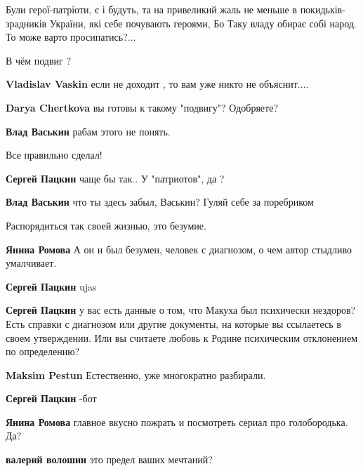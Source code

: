 \begin{itemize}

Були герої-патріоти, є і будуть, та на привеликий жаль не меньше в
покидьків-зрадників України, які себе почувають героями, Бо Таку владу обирає
собі народ. То може варто просипатись?...

В чём подвиг ?

\begin{itemize} %
\textbf{Vladislav Vaskin} если не доходит , то вам уже никто не объяснит....

\textbf{Darya Chertkova} вы готовы к такому "подвигу"? Одобряете?

\textbf{Влад Васькин} рабам этого не понять.
\end{itemize} %

Все правильно сделал!

\begin{itemize} %
\textbf{Сергей Пацкин} чаще бы так.. У "патриотов", да ?

\textbf{Влад Васькин} что ты здесь забыл, Васькин? Гуляй себе за поребриком
\end{itemize} %

Распорядиться так своей жизнью, это безумие.

\begin{itemize} %
\textbf{Янина Ромова} А он и был безумен, человек с диагнозом, о чем автор стыдливо умалчивает.

\begin{itemize} %
\textbf{Сергей Пацкин} ujas

\textbf{Сергей Пацкин} у вас есть данные о том, что Макуха был психически нездоров? Есть справки с диагнозом или другие документы, на которые вы ссылаетесь в своем утверждении. Или вы считаете любовь к Родине психическим отклонением по определению?

\textbf{Maksim Pestun} Естественно, уже многократно разбирали.

\textbf{Сергей Пацкин} -бот
\end{itemize} %

\textbf{Янина Ромова} главное вкусно пожрать и посмотреть сериал про голобородька. Да?

\textbf{валерий волошин} это предел ваших мечтаний?


\end{itemize}
\end{itemize}
